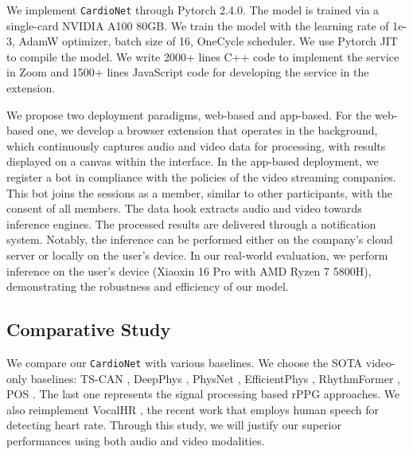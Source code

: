  We implement \texttt{CardioNet} through Pytorch 2.4.0. The model is trained via a single-card NVIDIA A100 80GB. We train the model with the learning rate of 1e-3,  AdamW optimizer, batch size of 16, OneCycle scheduler. We use Pytorch JIT to compile the model. We write 2000+ lines C++ code to implement the service in Zoom and 1500+ lines JavaScript code for developing the service in the extension. 


We propose two deployment paradigms, web-based and app-based. For the web-based one, we develop a browser extension that operates \sysname in the background, which continuously captures audio and video data for processing, with results displayed on a canvas within the interface. In the app-based deployment, we register a bot in compliance with the policies of the video streaming companies. This bot joins the sessions as a member, similar to other participants, with the consent of all members. The data hook extracts audio and video towards inference engines. The processed results are delivered through a notification system. Notably, the inference can be performed either on the company's cloud server or locally on the user's device.  In our real-world evaluation, we perform inference on the user's device (Xiaoxin 16 Pro with AMD Ryzen 7 5800H), demonstrating the robustness and efficiency of our model.



\subsection{Comparative Study}
We compare our \texttt{CardioNet} with various baselines. We choose the SOTA video-only baselines: TS-CAN \cite{liu2020multi}, DeepPhys \cite{chen2018deepphys}, PhysNet \cite{yu2019remote}, EfficientPhys \cite{liu2023efficientphys}, RhythmFormer \cite{zou2024rhythmformer}, POS \cite{wang2016algorithmic}. The last one represents the signal processing based rPPG approaches. We also reimplement VocalHR \cite{xu2022hearing}, the recent work that employs human speech for detecting heart rate. Through this study, we will justify our superior performances using both audio and video modalities.

